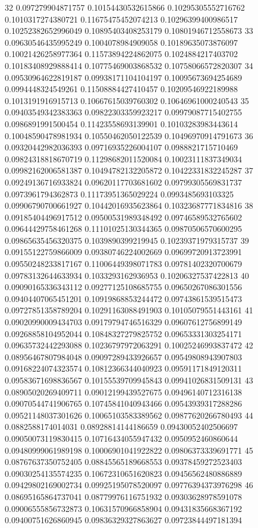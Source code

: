 32 0.097279904871757 0.10154430532615866 0.10295305552716762 0.1010317274380721 0.11675475452074213 0.10296399400986517 0.10252382652996049 0.10895403408253179 0.10801946712558673
33 0.09630546435995249 0.1004078984909058 0.10189635073876097 0.10021426258977364 0.11573894224862075 0.1024884217403702 0.10183408929888414 0.10775469003868532 0.10758066572820307
34 0.09530964622819187 0.09938171104104197 0.10095673694254689 0.0994448324549261 0.11508884427410457 0.10209546922189988 0.1013191916915713 0.10667615039760302 0.10646961000240543
35 0.09403549342383363 0.09822303359923217 0.09979087715402755 0.0986891991500454 0.11423558693139901 0.10103283983443614 0.10048590478981934 0.10550462050122539 0.10496970914791673
36 0.09320442982036393 0.09716935226004107 0.0988821715710469 0.09824318818670719 0.11298682011520084 0.10023111837349034 0.09982162006581387 0.10494782132205872 0.10422331832245287
37 0.09249136716933824 0.09620117703681602 0.09799305569831737 0.0973961794362873 0.11173951365029224 0.0993485693103325 0.09906790700661927 0.10442016935623864 0.10323687771834816
38 0.09185404496917512 0.09500531989348492 0.09746589532765602 0.09644429758461268 0.11101025130344365 0.09870506570600295 0.09865635456320375 0.1039890399219945 0.10239371979315737
39 0.09155122759866009 0.09380746224002669 0.09699720913723991 0.09550248233817167 0.11006449398071783 0.09781402320700679 0.09783132644633934 0.1033293162936953 0.10206327537422813
40 0.09090165336343112 0.09277125108685755 0.09650267086301556 0.09404407065451201 0.10919868853244472 0.09743861539515473 0.09727851358789204 0.10291163088491903 0.10105079551443161
41 0.09020990009434703 0.09179794746516329 0.09607612756899149 0.09268858104952044 0.10848327279825752 0.09653331303254171 0.09635732442293088 0.10236797972063291 0.10025246993837472
42 0.08956467807984048 0.09097289433926657 0.09549808943907803 0.09168224074323574 0.10812366344040923 0.09591171849120311 0.09583671698836567 0.10155539709945843 0.09941026831509131
43 0.08905020269409711 0.09012199439527675 0.09496140712316138 0.09070544741906765 0.10745841040943466 0.09543939317288286 0.09521148037301626 0.10065103583389562 0.09877620266780493
44 0.0882588174014031 0.08928814144186659 0.09430052402506697 0.09050073119830415 0.10716434055947432 0.0950952460860644 0.09480999061989198 0.10006901041922822 0.09806373339691771
45 0.08767637350752405 0.08845565189668553 0.09378459272523403 0.09030254135574235 0.10672310651620823 0.09456562480886889 0.09429802169002734 0.09925195078520097 0.09776394373976298
46 0.08695165864737041 0.08779976116751932 0.09303628978591078 0.09006555856732873 0.10631570966858904 0.09431835668367192 0.09400751626860945 0.09836329327863627 0.09723844497181394
